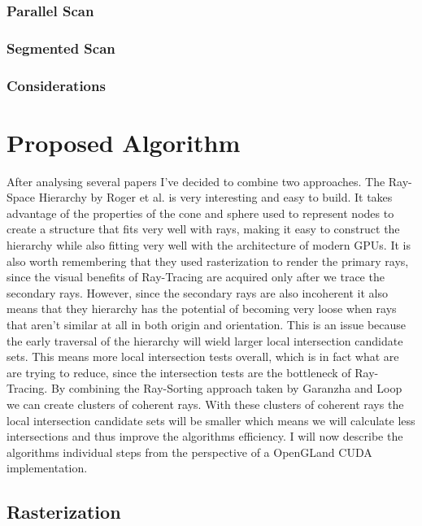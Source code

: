 \documentclass{llncs}
\begin{document}
\subsubsection{Parallel Scan}

\subsubsection{Segmented Scan}

\subsubsection{Considerations}


\newpage

%
\section{Proposed Algorithm}
%

After analysing several papers I've decided to combine two approaches. The Ray-Space Hierarchy by Roger et al. \cite{Roger07} is very interesting and easy to build. It takes advantage of the properties of the cone and sphere used to represent nodes to create a structure that fits very well with rays, making it easy to construct the hierarchy while also fitting very well with the architecture of modern GPUs. It is also worth remembering that they used rasterization to render the primary rays, since the visual benefits of Ray-Tracing are acquired only after we trace the secondary rays. However, since the secondary rays are also incoherent it also means that they hierarchy has the potential of becoming very loose when rays that aren't similar at all  in both origin and orientation. This is an issue because the early traversal of the hierarchy will wield larger local intersection candidate sets. This means more local intersection tests overall, which is in fact what are are trying to reduce, since the intersection tests are the bottleneck of Ray-Tracing. By combining the Ray-Sorting approach taken by Garanzha and Loop \cite{GaranzhaLoop10} we can create clusters of coherent rays. With these clusters of coherent rays the local intersection candidate sets will be smaller which means we will calculate less intersections and thus improve the algorithms efficiency. I will now describe the algorithms individual steps from the perspective of a OpenGLand CUDA implementation.


%
\subsection{Rasterization}
%
\end{document}
